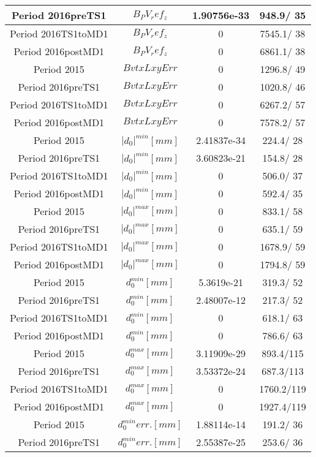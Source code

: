 \documentclass{article}
\begin{document}
\begin{longtable}{c|c|c|c}
\hline
 Period 2016preTS1 & $B_PV_ref_z$ & 1.90756e-33 & 948.9/ 35\\
\hline
 Period 2016TS1toMD1 & $B_PV_ref_z$ & 0 & 7545.1/ 38\\
\hline
 Period 2016postMD1 & $B_PV_ref_z$ & 0 & 6861.1/ 38\\
\hline
 Period 2015 & $BvtxLxyErr$ & 0 & 1296.8/ 49\\
\hline
 Period 2016preTS1 & $BvtxLxyErr$ & 0 & 1020.8/ 46\\
\hline
 Period 2016TS1toMD1 & $BvtxLxyErr$ & 0 & 6267.2/ 57\\
\hline
 Period 2016postMD1 & $BvtxLxyErr$ & 0 & 7578.2/ 57\\
\hline
 Period 2015 & $|d_{0}|^{min} [mm]$ & 2.41837e-34 & 224.4/ 28\\
\hline
 Period 2016preTS1 & $|d_{0}|^{min} [mm]$ & 3.60823e-21 & 154.8/ 28\\
\hline
 Period 2016TS1toMD1 & $|d_{0}|^{min} [mm]$ & 0 & 506.0/ 37\\
\hline
 Period 2016postMD1 & $|d_{0}|^{min} [mm]$ & 0 & 592.4/ 35\\
\hline
 Period 2015 & $|d_{0}|^{max} [mm]$ & 0 & 833.1/ 58\\
\hline
 Period 2016preTS1 & $|d_{0}|^{max} [mm]$ & 0 & 635.1/ 59\\
\hline
 Period 2016TS1toMD1 & $|d_{0}|^{max} [mm]$ & 0 & 1678.9/ 59\\
\hline
 Period 2016postMD1 & $|d_{0}|^{max} [mm]$ & 0 & 1794.8/ 59\\
\hline
 Period 2015 & $d_{0}^{min} [mm]$ & 5.3619e-21 & 319.3/ 52\\
\hline
 Period 2016preTS1 & $d_{0}^{min} [mm]$ & 2.48007e-12 & 217.3/ 52\\
\hline
 Period 2016TS1toMD1 & $d_{0}^{min} [mm]$ & 0 & 618.1/ 63\\
\hline
 Period 2016postMD1 & $d_{0}^{min} [mm]$ & 0 & 786.6/ 63\\
\hline
 Period 2015 & $d_{0}^{max} [mm]$ & 3.11909e-29 & 893.4/115\\
\hline
 Period 2016preTS1 & $d_{0}^{max} [mm]$ & 3.53372e-24 & 687.3/113\\
\hline
 Period 2016TS1toMD1 & $d_{0}^{max} [mm]$ & 0 & 1760.2/119\\
\hline
 Period 2016postMD1 & $d_{0}^{max} [mm]$ & 0 & 1927.4/119\\
\hline
 Period 2015 & $d_{0}^{min} err. [mm]$ & 1.88114e-14 & 191.2/ 36\\
\hline
 Period 2016preTS1 & $d_{0}^{min} err. [mm]$ & 2.55387e-25 & 253.6/ 36\\

\end{longtable}
\end{document}
